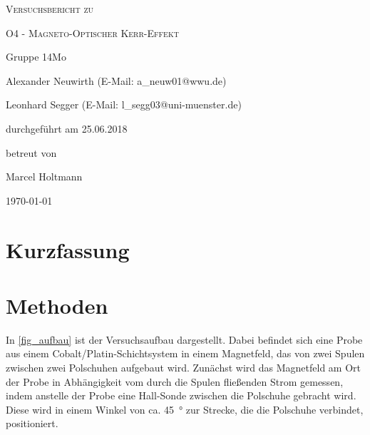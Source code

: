 \documentclass[
	a4paper,
	12pt,
	pagesize,
	ngerman
]{scrartcl}
\begin{document}
	
	\begin{titlepage}
		\centering
		{\scshape\LARGE Versuchsbericht zu \par}
		\vspace{1cm}
		{\scshape\huge O4 - Magneto-Optischer Kerr-Effekt \par}
		\vspace{2.5cm}
		{\LARGE Gruppe 14Mo \par}
		\vspace{0.5cm}
		
		{\large Alexander Neuwirth (E-Mail: a\_neuw01@wwu.de) \par}
		{\large Leonhard Segger (E-Mail: l\_segg03@uni-muenster.de) \par}
		\vfill
		
		durchgeführt am 25.06.2018\par
		betreut von\par
		{\large Marcel Holtmann} %
		
		\vfill
		
		{\large \today\par}
	\end{titlepage}
	\tableofcontents
	\newpage


	\section{Kurzfassung}
	
	\section{Methoden}
	In \cref{fig_aufbau} ist der Versuchsaufbau dargestellt.
	Dabei befindet sich eine Probe aus einem Cobalt/Platin-Schichtsystem in einem Magnetfeld, das von zwei Spulen zwischen zwei Polschuhen aufgebaut wird.
	Zunächst wird das Magnetfeld am Ort der Probe in Abhängigkeit vom durch die Spulen fließenden Strom gemessen, indem anstelle der Probe eine Hall-Sonde zwischen die Polschuhe gebracht wird.
	Diese wird in einem Winkel von ca. \SI{45}{\degree} zur Strecke, die die Polschuhe verbindet, positioniert. 	
\end{document}
